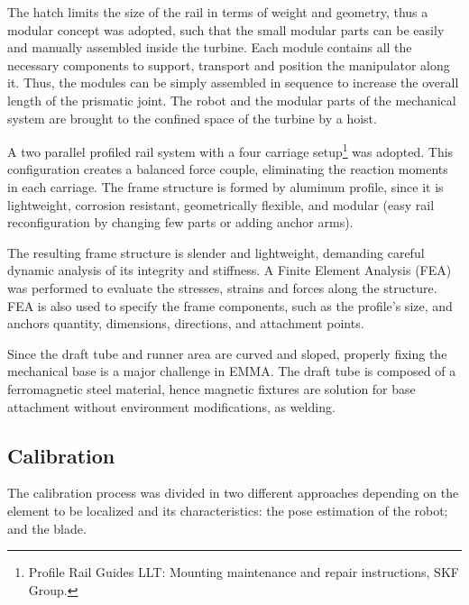 The hatch limits the size of the rail in terms of weight
and geometry, thus a modular concept was adopted, such that the small modular
parts can be easily and manually assembled inside the turbine. Each module
contains all the necessary components to support, transport and position the
manipulator along it. Thus, the modules can be simply assembled in
sequence to increase the overall length of the prismatic joint. The robot and
the modular parts of the mechanical system are brought to the confined
space of the turbine by a hoist.

A two parallel profiled rail system with a four carriage
setup\footnote{Profile Rail Guides LLT: Mounting maintenance and repair
instructions, SKF Group.} was adopted. %
This configuration creates a balanced force couple, eliminating the reaction
moments in each carriage. The frame structure is formed by aluminum
profile, since it is lightweight, corrosion resistant, geometrically flexible,
and modular (easy rail reconfiguration by changing few parts or adding anchor
arms).

The resulting frame structure is slender and lightweight, demanding careful
dynamic analysis of its integrity and stiffness. A Finite Element Analysis (FEA)
was performed to evaluate the stresses, strains and forces along the structure.
FEA is also used to specify the frame components, such as the profile's size,
and anchors quantity, dimensions, directions, and attachment points.

Since the draft tube and runner area are curved and sloped, properly fixing
the mechanical base is a major challenge in EMMA. The draft tube is composed of a
ferromagnetic steel material, hence magnetic fixtures are solution for base
attachment without environment modifications, as welding.

\subsection{Calibration}
 
The calibration process was divided in two different approaches depending on the
element to be localized and its characteristics: the pose estimation of the
robot; and the blade.
   
